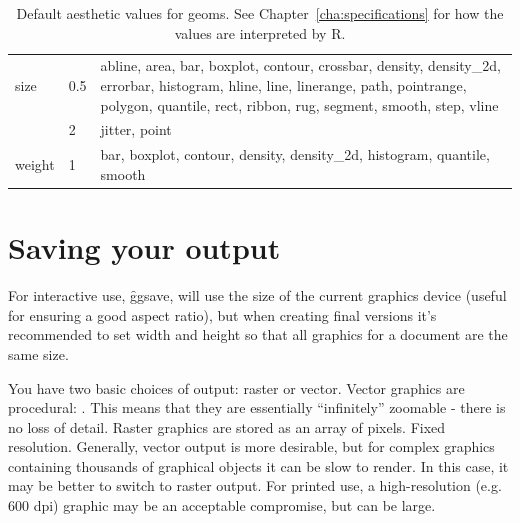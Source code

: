 \begin{table}
\begin{center}
\begin{tabular}{llp{4in}}
    size & 0.5       & abline, area, bar, boxplot, contour, crossbar, density, density\_2d, errorbar, histogram, hline, line, linerange, path, pointrange, polygon, quantile, rect, ribbon, rug, segment, smooth, step, vline\\
     & 2         & jitter, point                                                                                                                                                                                        \\
    weight & 1       & bar, boxplot, contour, density, density\_2d, histogram, quantile, smooth                                                                                                                              \\
  \bottomrule
  \end{tabular}
  \end{center}
  \caption{Default aesthetic values for geoms.  See Chapter~\ref{cha:specifications} for how the values are interpreted by R.}
  \label{tbl:geom-defaults}
\end{table}


% 


\section{Saving your output}
\label{sec:saving}

For interactive use, \f{ggsave}, will use the size of the current graphics device (useful for ensuring a good aspect ratio), but when creating final versions it's recommended to set width and height so that all graphics for a document are the same size.

You have two basic choices of output: raster or vector.  Vector graphics are procedural: .  This means that they are essentially ``infinitely'' zoomable - there is no loss of detail.  Raster graphics are stored as an array of pixels.  Fixed resolution.  Generally, vector output is more desirable, but for complex graphics containing thousands of graphical objects it can be slow to render.  In this case, it may be better to switch to raster output.  For printed use, a high-resolution (e.g. 600 dpi) graphic may be an acceptable compromise, but can be large.

